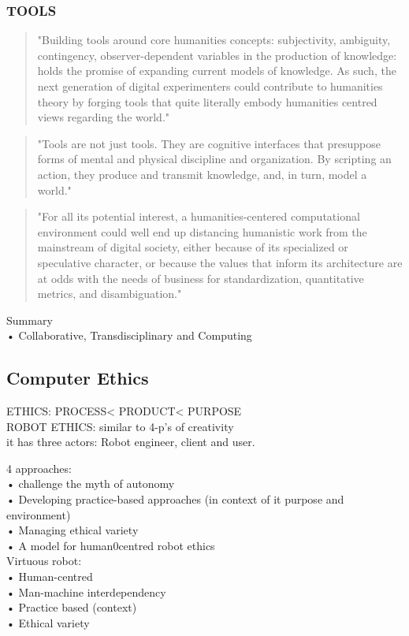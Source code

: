 \subsubsection{TOOLS}
\begin{quote}
"Building tools around core humanities concepts: subjectivity, ambiguity, contingency, observer-dependent variables in the production of knowledge: holds the promise of expanding current models of knowledge. As such, the next generation of digital experimenters could contribute to humanities theory by forging tools that quite literally embody humanities centred views regarding the world." \citep[p.104]{Burdick2012}
\end{quote}

\begin{quote}
"Tools are not just tools. They are cognitive interfaces that presuppose forms of mental and physical discipline and organization. By scripting an action, they produce and transmit knowledge, and, in turn, model a world." \citep[p.105]{Burdick2012}
\end{quote}

\begin{quote}
"For all its potential interest, a humanities-centered computational environment could well end up distancing humanistic work from the mainstream of digital society, either because of its specialized or speculative character, or because the values that inform its architecture are at odds with the needs of business for standardization, quantitative metrics, and disambiguation." \citep[p.105]{Burdick2012}
\end{quote}

\begin{shaded}
Summary\\
•	Collaborative, Transdisciplinary and Computing
\end{shaded}

\subsection{Computer Ethics}

\begin{draft}
ETHICS: PROCESS< PRODUCT< PURPOSE\\
ROBOT ETHICS: similar to 4-p’s of creativity \citep{McBride2013}\\

it has three actors: Robot engineer, client and user.

4 approaches:\\
•	challenge the myth of autonomy\\
•	Developing practice-based approaches (in context of it purpose and environment)\\
•	Managing ethical variety\\
•	A model for human0centred robot ethics\\

Virtuous robot:\\
•	Human-centred\\
•	Man-machine interdependency\\
•	Practice based (context)\\
•	Ethical variety
\end{draft}


